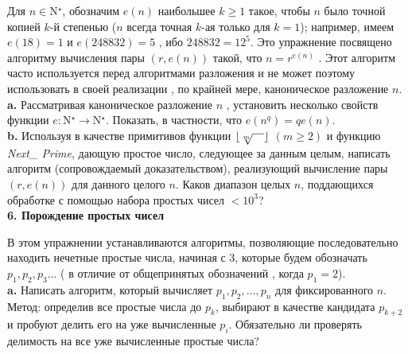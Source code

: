 Для $n \in $N${^\star}$, обозначим $e\left({n}\right)$  наибольшее $k\geq{1}$ такое, чтобы $n$ было точной копией $k$-й степенью ($n$  всегда точная $k$-ая только для $k=1$); например, имеем $e\left({18}\right)=1$ и $e\left({248832}\right)=5$ , ибо $248832=12^{5}$. Это упражнение посвящено алгоритму вычисления пары $\left({r,e\left({n}\right)}\right)$  такой, что $n=r^{e\left({n}\right)}$ . Этот алгоритм часто используется перед алгоритмами разложения и не может поэтому использовать в своей реализации , по крайней мере,  каноническое разложение $n$.\newline
\\
\hspace*{15pt}\textbf{a.} Рассматривая каноническое разложение $n$ , установить несколько свойств функции $e:$N$^\star\rightarrow $N$^\star$. Показать, в частности, что $e\left({n^{q}}\right)=qe\left({n}\right)$.\newline
\\
\hspace*{15pt}\textbf{b.} Используя в качестве примитивов функции $\lfloor{\sqrt[m]{\hspace*{10pt}}}\rfloor$ $\left({m\geq {2}}\right)$ и функцию \textit{Next\_ Prime}, дающую простое число, следующее за данным целым, написать алгоритм (сопровождаемый доказательством), реализующий вычисление пары $\left({r,e\left({n}\right)}\right)$  для данного целого $n$. Каков диапазон целых $n$, поддающихся обработке с помощью набора простых чисел $<10^{3}$? \newline
\\

\noindent\textbf{6. Порождение простых чисел}\ \newline

В этом упражнении устанавливаются алгоритмы, позволяющие последовательно находить нечетные простые числа, начиная с 3, которые будем обозначать $p_{1},p_{2},p_{3} \ldots $ ( в отличие от общепринятых обозначений , когда $p_{1}=2$). \newline
\\
\hspace*{15pt}\textbf{ a.} Написать алгоритм, который вычисляет $p_{1},p_{2},\ldots ,p_{n} $ для фиксированного $n$. Метод: определив все простые числа до $p_{k}$, выбирают в качестве кандидата $p_{k+2}$ и пробуют делить его на уже вычисленные $p_{i}$. Обязательно ли проверять делимость на все уже вычисленные простые числа?

\newpage
	

